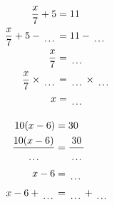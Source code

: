\documentclass[12pt]{article}
\newcounter{minipagecount}
\begin{document}
\begin{multicols}{2}
\begin{minipage}[t]{0.45\textwidth}
    \raggedright %
    \begin{align*} %
        \frac{x}{7} + 5 &= 11\\
        \frac{x}{7} + 5 - \dotuline{\hspace{5mm}} &= 11 - \dotuline{\hspace{5mm}}\\
        \frac{x}{7} &= \dotuline{\hspace{5mm}}\\
        \frac{x}{7} \times\dotuline{\hspace{5mm}} &= \dotuline{\hspace{5mm}} \times\dotuline{\hspace{5mm}}\\
        x &= \dotuline{\hspace{5mm}}\\
    \end{align*}
\end{minipage} %
\noindent{(\theminipagecount)}\hspace{0.1mm} %
\begin{minipage}[t]{0.45\textwidth} %
    \vspace{-26pt}  %
    \raggedright %
    \begin{align*} %
        10(x - 6) &= 30\\
        \frac{10(x-6)}{\dotuline{\hspace{5mm}}} &= \frac{30}{\dotuline{\hspace{5mm}}}\\
        x - 6 &= \dotuline{\hspace{5mm}}\\
        x - 6 + \dotuline{\hspace{5mm}} &= \dotuline{\hspace{5mm}} + \dotuline{\hspace{5mm}}\\

\end{align*}
\end{minipage}
\end{multicols}
\end{document}
